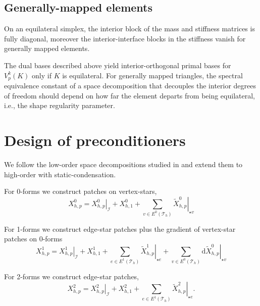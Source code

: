 \documentclass[review,onefignum,onetabnum,a4paper]{siamart190516}
\newcommand{\mesh}{\mathcal{T}_h}
\begin{document}
\subsection{Generally-mapped elements}

On an equilateral simplex, the interior block of the mass and stiffness matrices
is fully diagonal, moreover the interior-interface blocks in the stiffness 
vanish for generally mapped elements.

The dual bases described above yield interior-orthogonal primal bases for $V^k_p(K)$ only
if $K$ is equilateral. For generally mapped triangles, the spectral equivalence constant of
a space decomposition that decouples the interior degrees of freedom should depend on how
far the element departs from being equilateral, i.e., the shape regularity parameter. 



\section{Design of preconditioners}




We follow 
the low-order space decompositions studied in \cite{arnold00}
and extend them to high-order with static-condensation.

For 0-forms we construct patches on vertex-stars,
\begin{equation}
   X^0_{h,p} = \left.X^0_{h,p}\right|_\mathcal{I} + X^0_{h,1} 
   + \sum_{v\in E^0(\mesh)} \left.\tilde{X}^0_{h,p}\right|_{\star v} 
\end{equation}

For 1-forms we construct edge-star patches
plus the gradient of vertex-star patches on 0-forms
\begin{equation}
   X^1_{h,p} = \left.X^1_{h,p}\right|_\mathcal{I} +  X^1_{h,1}
   + \sum_{e\in E^1(\mesh)} \left.\tilde{X}^1_{h,p}\right|_{\star e} 
   + \sum_{v\in E^0(\mesh)} \mathrm{d} \left.\tilde{X}^0_{h,p}\right|_{\star v} 
\end{equation}

For 2-forms we construct edge-star patches,
\begin{equation}
   X^2_{h,p} = \left.X^2_{h,p}\right|_\mathcal{I} +  X^2_{h,1} 
   + \sum_{e\in E^1(\mesh)} \left.\tilde{X}^2_{h,p}\right|_{\star e}. 
\end{equation}
\end{document}
